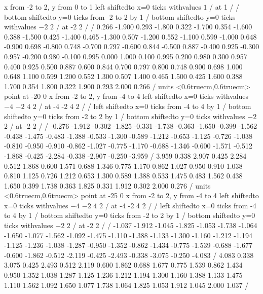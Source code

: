 {\setplotarea x from -2 to 2, y from 0 to 1
\axis left shiftedto x=0 ticks withvalues {$1$} / at 1 / /
\axis bottom shiftedto y=0 ticks from -2 to 2 by 1 /
\axis bottom shiftedto y=0 ticks withvalues {$-2$} {$2$} / at -2 2 / /
 0.266 -1.900 0.293 -1.800 0.322 -1.700 0.354 -1.600 0.388 
-1.500 0.425 -1.400 0.465 -1.300 0.507 -1.200 0.552 -1.100 0.599 
-1.000 0.648 -0.900 0.698 -0.800 0.748 -0.700 0.797 -0.600 0.844 
-0.500 0.887 -0.400 0.925 -0.300 0.957 -0.200 0.980 -0.100 0.995 
0.000 1.000 0.100 0.995 0.200 0.980 0.300 0.957 0.400 0.925 
0.500 0.887 0.600 0.844 0.700 0.797 0.800 0.748 0.900 0.698 
1.000 0.648 1.100 0.599 1.200 0.552 1.300 0.507 1.400 0.465 
1.500 0.425 1.600 0.388 1.700 0.354 1.800 0.322 1.900 0.293 
2.000 0.266 /
\setcoordinatesystem units <0.6truecm,0.6truecm> point at -20 0
\setplotarea x from -2 to 2, y from -4 to 4
\axis left shiftedto x=0 ticks withvalues {$-4$} {$-2$}
{$4$} {$2$} / at -4  -2  4 2 / /
\axis left shiftedto x=0 ticks from -4 to 4 by 1 /
\axis bottom shiftedto y=0 ticks from -2 to 2 by 1 /
\axis bottom shiftedto y=0 ticks withvalues {$-2$} {$2$} / at -2 2 / /
 -0.276 -1.912 -0.302 -1.825 -0.331 -1.738 -0.363 -1.650 -0.399 
-1.562 -0.438 -1.475 -0.483 -1.388 -0.533 -1.300 -0.589 -1.212 -0.653 
-1.125 -0.726 -1.038 -0.810 -0.950 -0.910 -0.862 -1.027 -0.775 -1.170 
-0.688 -1.346 -0.600 -1.571 -0.512 -1.868 -0.425 -2.284 -0.338 -2.907 
-0.250 -3.959 /
 3.959 0.338 2.907 0.425 2.284 0.512 1.868 0.600 1.571 
0.688 1.346 0.775 1.170 0.862 1.027 0.950 0.910 1.038 0.810 
1.125 0.726 1.212 0.653 1.300 0.589 1.388 0.533 1.475 0.483 
1.562 0.438 1.650 0.399 1.738 0.363 1.825 0.331 1.912 0.302 
2.000 0.276 /
\setcoordinatesystem units <0.6truecm,0.6truecm> point at -25 0
\setplotarea x from -2 to 2, y from -4 to 4
\axis left shiftedto x=0 ticks withvalues {$-4$} {$-2$}
{$4$} {$2$} / at -4  -2  4 2 / /
\axis left shiftedto x=0 ticks from -4 to 4 by 1 /
\axis bottom shiftedto y=0 ticks from -2 to 2 by 1 /
\axis bottom shiftedto y=0 ticks withvalues {$-2$} {$2$} / at -2 2 / /
 -1.037 -1.912 -1.045 -1.825 -1.053 -1.738 -1.064 -1.650 -1.077 
-1.562 -1.092 -1.475 -1.110 -1.388 -1.133 -1.300 -1.160 -1.212 -1.194 
-1.125 -1.236 -1.038 -1.287 -0.950 -1.352 -0.862 -1.434 -0.775 -1.539 
-0.688 -1.677 -0.600 -1.862 -0.512 -2.119 -0.425 -2.493 -0.338 -3.075 
-0.250 -4.083 /
 4.083 0.338 3.075 0.425 2.493 0.512 2.119 0.600 1.862 
0.688 1.677 0.775 1.539 0.862 1.434 0.950 1.352 1.038 1.287 
1.125 1.236 1.212 1.194 1.300 1.160 1.388 1.133 1.475 1.110 
1.562 1.092 1.650 1.077 1.738 1.064 1.825 1.053 1.912 1.045 
2.000 1.037 /
\endpicture}

